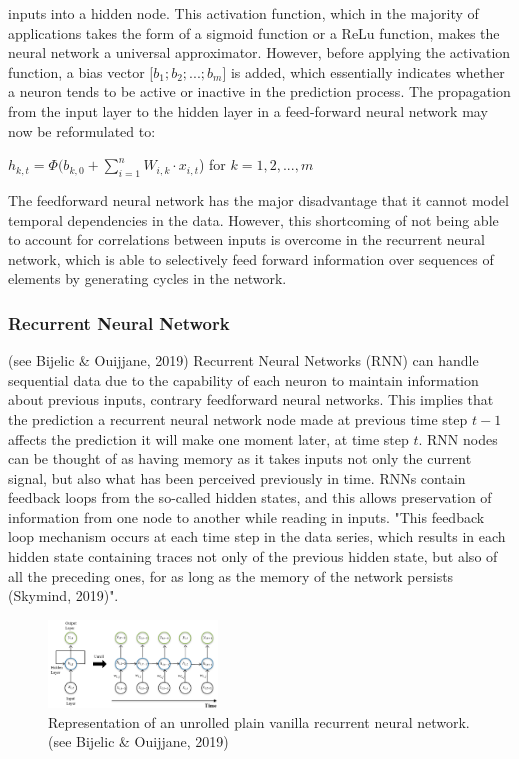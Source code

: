 \documentclass[a4paper,11pt,oneside]{book}
\begin{document}
inputs into a hidden node. This activation function, which in the majority of
applications takes the form of a sigmoid function or a ReLu function, makes the neural network a universal approximator. However, before applying
the activation function, a bias vector [$b_{1};b_{2};...;b_{m}$] is added, which essentially
indicates whether a neuron tends to be active or inactive in the prediction process. The
propagation from the input layer to the hidden layer in a feed-forward neural
network may now be reformulated to:
 \begin{center}
	$h_{k,t} =\Phi(b_{k,0} +\sum_{i=1}^{n} W_{i,k} \cdot x_{i,t}$) for $k = 1,2,...,m$
\end{center}
The feedforward neural network has the major disadvantage that it cannot model temporal dependencies in the data. However, this shortcoming of not being able to account for correlations between inputs is overcome in the recurrent neural network, which is able to selectively feed forward information over sequences of elements by generating cycles in the network.
\subsubsection{Recurrent Neural Network} (see Bijelic \& Ouijjane, 2019)
Recurrent Neural Networks
(RNN) can handle sequential data due to the capability of each neuron to
maintain information about previous inputs, contrary feedforward neural networks. This implies that the prediction a recurrent
neural network node made at previous time step $t-1$ affects the prediction it will make one
moment later, at time step $t$. RNN nodes can be thought of as having memory as it takes inputs not only the current signal, but also
what has been perceived previously in time.\newline\newline
RNNs contain feedback loops from the so-called hidden states, and this allows preservation of information from one node to another while reading in inputs. "This feedback loop
mechanism occurs at each time step in the data series, which results in each hidden
state containing traces not only of the previous hidden state, but also of all the
preceding ones, for as long as the memory of the network persists (Skymind, 2019)".\newline

\begin{figure}
	\centering
	\includegraphics[width=0.4\textwidth]{figures/RNN}
	\caption{Representation of an unrolled plain vanilla recurrent neural network. (see Bijelic \& Ouijjane, 2019)}
	
	\label{seventhfig}
\end{figure}
\end{document}
